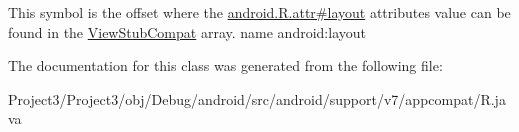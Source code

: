 This symbol is the offset where the \hyperlink{}{android.\+R.\+attr\#layout} attribute\textquotesingle{}s value can be found in the \hyperlink{classandroid_1_1support_1_1v7_1_1appcompat_1_1R_1_1styleable_a59b69ba1b80ee4157819f6b964a66358}{View\+Stub\+Compat} array.  name android\+:layout 

The documentation for this class was generated from the following file\+:\begin{DoxyCompactItemize}
\item 
Project3/\+Project3/obj/\+Debug/android/src/android/support/v7/appcompat/R.\+java\end{DoxyCompactItemize}
